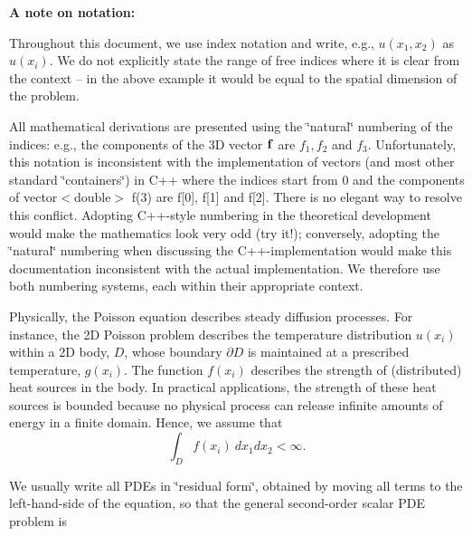 \begin{center} \begin{TabularC}{1}
\hline
\begin{center} {\bfseries  A note on notation\-: } \end{center}  Throughout this document, we use index notation and write, e.\-g., $ u(x_1,x_2) $ as $ u(x_i) $. We do not explicitly state the range of free indices where it is clear from the context -- in the above example it would be equal to the spatial dimension of the problem.

All mathematical derivations are presented using the \char`\"{}natural\char`\"{} numbering of the indices\-: e.\-g., the components of the 3\-D vector ${\bf f}$ are $ f_1, f_2 $ and $ f_3 $. Unfortunately, this notation is inconsistent with the implementation of vectors (and most other standard \char`\"{}containers\char`\"{}) in C++ where the indices start from 0 and the components of {\ttfamily vector$<$double$>$} {\ttfamily f(3)} are {\ttfamily f}\mbox{[}0\mbox{]}, {\ttfamily f}\mbox{[}1\mbox{]} and {\ttfamily f}\mbox{[}2\mbox{]}. There is no elegant way to resolve this conflict. Adopting C++-\/style numbering in the theoretical development would make the mathematics look very odd (try it!); conversely, adopting the \char`\"{}natural\char`\"{} numbering when discussing the C++-\/implementation would make this documentation inconsistent with the actual implementation. We therefore use both numbering systems, each within their appropriate context.   \\
\end{TabularC}
\end{center} 

Physically, the Poisson equation describes steady diffusion processes. For instance, the 2\-D Poisson problem describes the temperature distribution $u(x_i) $ within a 2\-D body, $D$, whose boundary $\partial D$ is maintained at a prescribed temperature, $ g(x_i)$. The function $ f(x_i)$ describes the strength of (distributed) heat sources in the body. In practical applications, the strength of these heat sources is bounded because no physical process can release infinite amounts of energy in a finite domain. Hence, we assume that \[ \int_D f(x_i) \ dx_1 dx_2 < \infty. \]

We usually write all P\-D\-Es in \char`\"{}residual form\char`\"{}, obtained by moving all terms to the left-\/hand-\/side of the equation, so that the general second-\/order scalar P\-D\-E problem is

